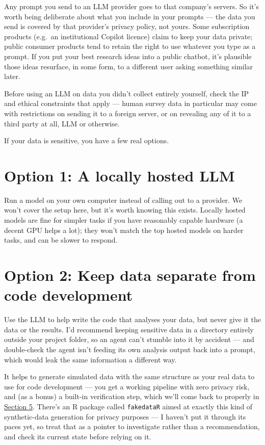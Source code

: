 \documentclass[
  letterpaper,
  DIV=11,
  numbers=noendperiod]{scrreprt}
\begin{document}
Any prompt you send to an LLM provider goes to that company's servers.
So it's worth being deliberate about what you include in your prompts
--- the data you send is covered by that provider's privacy policy, not
yours. Some subscription products (e.g.~an institutional Copilot
licence) claim to keep your data private; public consumer products tend
to retain the right to use whatever you type as a prompt. If you put
your best research ideas into a public chatbot, it's plausible those
ideas resurface, in some form, to a different user asking something
similar later.

Before using an LLM on data you didn't collect entirely yourself, check
the IP and ethical constraints that apply --- human survey data in
particular may come with restrictions on sending it to a foreign server,
or on revealing any of it to a third party at all, LLM or otherwise.

If your data is sensitive, you have a few real options.

\section{Option 1: A locally hosted
LLM}\label{option-1-a-locally-hosted-llm}

Run a model on your own computer instead of calling out to a provider.
We won't cover the setup here, but it's worth knowing this exists.
Locally hosted models are fine for simpler tasks if you have reasonably
capable hardware (a decent GPU helps a lot); they won't match the top
hosted models on harder tasks, and can be slower to respond.

\section{Option 2: Keep data separate from code
development}\label{option-2-keep-data-separate-from-code-development}

Use the LLM to help write the code that analyses your data, but never
give it the data or the results. I'd recommend keeping sensitive data in
a directory entirely outside your project folder, so an agent can't
stumble into it by accident --- and double-check the agent isn't feeding
its own analysis output back into a prompt, which would leak the same
information a different way.

It helps to generate simulated data with the same structure as your real
data to use for code development --- you get a working pipeline with
zero privacy risk, and (as a bonus) a built-in verification step, which
we'll come back to properly in
\href{../section-5-agentic-engineering/03-simulated-data-verification.qmd}{Section
5}. There's an R package called \texttt{fakedataR} aimed at exactly this
kind of synthetic-data generation for privacy purposes --- I haven't put
it through its paces yet, so treat that as a pointer to investigate
rather than a recommendation, and check its current state before relying
on it.
\end{document}
